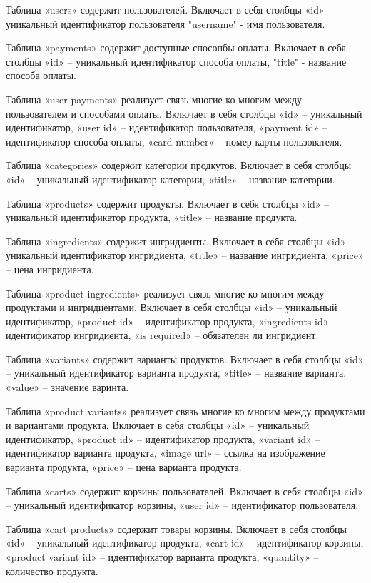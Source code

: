 \documentclass[a4paper,14pt]{extarticle}
\begin{document}
  Таблица «users» содержит пользователей. Включает в себя столбцы «id» -- уникальный идентификатор пользователя "username" - имя пользователя.

  Таблица «payments» содержит доступные спосопбы оплаты. Включает в себя столбцы «id» -- уникальный идентификатор способа оплаты, "title" - название способа оплаты.

  Таблица «user payments» реализует связь многие ко многим между пользователем и способами оплаты. Включает в себя столбцы «id» -- уникальный идентификатор, «user id» -- идентификатор пользователя, «payment id» -- идентификатор способа оплаты, «card number» -- номер карты пользователя.

  Таблица «categories» содержит категории продкутов. Включает в себя столбцы «id» -- уникальный идентификатор категории, «title» -- название категории.

  Таблица «products» содержит продукты. Включает в себя столбцы «id» -- уникальный идентификатор продукта, «title» -- название продукта.

  Таблица «ingredients» содержит ингридиенты. Включает в себя столбцы «id» -- уникальный идентификатор ингридиента, «title» -- название ингридиента, «price» -- цена ингридиента.

  Таблица «product ingredients» реализует связь многие ко многим между продуктами и ингридиентами. Включает в себя столбцы «id» -- уникальный идентификатор, «product id» -- идентификатор продукта, «ingredients id» -- идентификатор ингридиента, «is required» -- обязателен ли ингридиент.

  Таблица «variants» содержит варианты продуктов. Включает в себя столбцы «id» -- уникальный идентификатор варианта продукта, «title» -- название варианта, «value» -- значение варинта.

  Таблица «product variants» реализует связь многие ко многим между продуктами и вариантами продукта. Включает в себя столбцы «id» -- уникальный идентификатор, «product id» -- идентификатор продукта, «variant id» -- идентификатор варианта продукта, «image url» -- ссылка на изображение варианта продукта, «price» -- цена варианта продукта.

  Таблица «carts» содержит корзины пользователей. Включает в себя столбцы «id» -- уникальный идентификатор корзины, «user id» -- идентификатор пользователя.

  Таблица «cart products» содержит товары корзины. Включает в себя столбцы «id» -- уникальный идентификатор продукта, «cart id» -- идентификатор корзины, «product variant id» -- идентификатор варианта продукта, «quantity» -- количество продукта.
\end{document}
